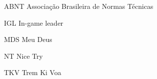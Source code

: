 
\begin{siglas}
    \item[ABNT] Associação Brasileira de Normas Técnicas
    \item[IGL] In-game leader
    \item[MDS] Meu Deus
    \item[NT] Nice Try
    \item[TKV] Trem Ki Voa
\end{siglas}

